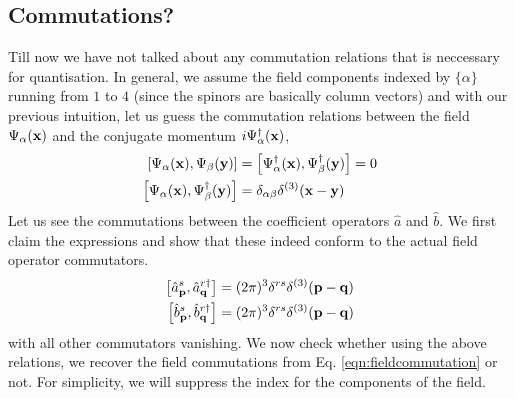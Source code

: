 \subsection{Commutations?}
Till now we have not talked about any commutation relations that is neccessary for quantisation. In general, we assume the field components indexed by $\{\alpha\}$ running from $1$ to $4$  (since the spinors are basically column vectors) and with our previous intuition, let us guess the commutation relations between the field $\Psi_{\alpha}(\vb{x})$ and the conjugate momentum $i\Psi_{\alpha}^\dagger(\vb{x})$,
\begin{align}\label{eqn:fieldcommutation}
   \begin{split}
   \left[ \Psi_{\alpha}(\vb{x}), \Psi_{\beta}(\vb{y}) \right] &= \left[ \Psi_{\alpha}^\dagger(\vb{x}), \Psi_{\beta}^\dagger(\vb{y}) \right] = 0\\
   \left[ \Psi_{\alpha}(\vb{x}), \Psi_{\beta}^\dagger(\vb{y}) \right] &= \delta_{\alpha\beta}\delta^{(3)}(\vb{x}-\vb{y})
   \end{split}
\end{align}
Let us see the commutations between the coefficient operators $\hat{a}$ and $\hat{b}$. We first claim the expressions and show that these indeed conform to the actual field operator commutators. 
\begin{align}\label{eqn:creationcommut}
   \begin{split}
   \left[ {\hat{a}_{\vb{p}}}^{s}, {\hat{a}_{\vb{q}}}^{r\dagger} \right]  &= (2\pi)^3\delta^{rs}\delta^{(3)}(\vb{p} - \vb{q})\\
   \left[ {\hat{b}_{\vb{p}}}^{s}, {\hat{b}_{\vb{q}}}^{r\dagger} \right]  &= (2\pi)^3\delta^{rs}\delta^{(3)}(\vb{p} - \vb{q})
   \end{split}
\end{align}
with all other commutators vanishing. We now check whether using the above relations, we recover the field commutations from Eq. \ref{eqn:fieldcommutation} or not. For simplicity, we will suppress the index for the components of the field.
